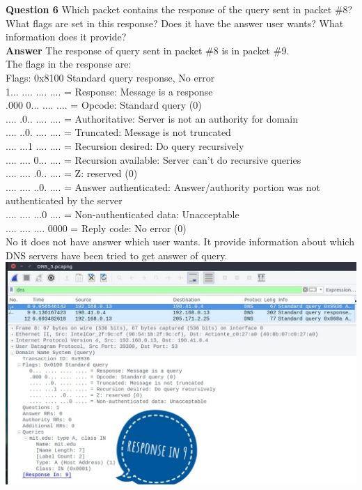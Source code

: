 \documentclass[14pt]{extarticle}
\begin{document}
    \noindent
    \textbf{\large Question 6}
    Which packet contains the response of the query sent in packet \#8? What flags are set in this response?
Does it have the answer user wants? What information does it provide?\\[10pt]
    \textbf{\large Answer}
    The response of query sent in packet \#8 is in packet \#9.\\
    The flags in the response are:\\
    Flags: 0x8100 Standard query response, No error\\
    1... .... .... .... = Response: Message is a response\\
    .000 0... .... .... = Opcode: Standard query (0)\\
    .... .0.. .... .... = Authoritative: Server is not an authority for domain\\
    .... ..0. .... .... = Truncated: Message is not truncated\\
    .... ...1 .... .... = Recursion desired: Do query recursively\\
    .... .... 0... .... = Recursion available: Server can't do recursive queries\\
    .... .... .0.. .... = Z: reserved (0)\\
    .... .... ..0. .... = Answer authenticated: Answer/authority portion was not authenticated by the server\\
    .... .... ...0 .... = Non-authenticated data: Unacceptable\\
    .... .... .... 0000 = Reply code: No error (0)\\
    No it does not have answer which user wants. It provide information about which DNS servers have been tried to get answer of query.\\[10pt]
    \includegraphics[scale=0.45]{3_6_1}\\[10pt]
\end{document}

